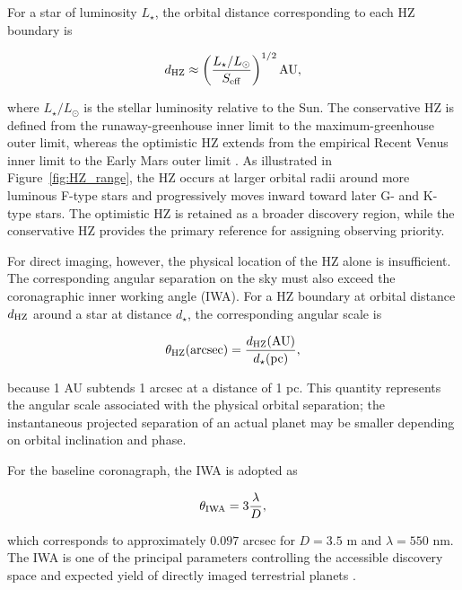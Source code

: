 For a star of luminosity $L_\star$, the orbital distance corresponding to each
HZ boundary is

\begin{equation}
d_{\rm HZ}
\approx
\left(
\frac{L_\star/L_\odot}{S_{\rm eff}}
\right)^{1/2}
{\rm AU},
\label{eq:hz-distance}
\end{equation}

\noindent
where $L_\star/L_\odot$ is the stellar luminosity relative to the Sun. The
conservative HZ is defined from the runaway-greenhouse inner limit to the
maximum-greenhouse outer limit, whereas the optimistic HZ extends from the
empirical Recent Venus inner limit to the Early Mars outer limit
\cite{kopparapu13,kopparapu14}. As illustrated in
Figure~\ref{fig:HZ_range}, the HZ occurs at larger orbital radii around more
luminous F-type stars and progressively moves inward toward later G- and K-type
stars. The optimistic HZ is retained as a broader discovery region, while the
conservative HZ provides the primary reference for assigning observing priority.

For direct imaging, however, the physical location of the HZ alone is insufficient.
The corresponding angular separation on the sky must also exceed the coronagraphic
inner working angle (IWA). For a HZ boundary at orbital distance $d_{\rm HZ}$
around a star at distance $d_\star$, the corresponding angular scale is

\begin{equation}
\theta_{\rm HZ}({\rm arcsec})
=
\frac{d_{\rm HZ}({\rm AU})}{d_\star({\rm pc})},
\label{eq:hz-angular}
\end{equation}

\noindent
because 1 AU subtends 1 arcsec at a distance of 1 pc. This quantity represents
the angular scale associated with the physical orbital separation; the
instantaneous projected separation of an actual planet may be smaller depending
on orbital inclination and phase.

For the baseline coronagraph, the IWA is adopted as

\begin{equation}
\theta_{\rm IWA}
=
3\frac{\lambda}{D},
\label{eq:IWA}
\end{equation}

\noindent
which corresponds to approximately $0.097$ arcsec for $D=3.5$ m and
$\lambda=550$ nm. The IWA is one of the principal parameters controlling the
accessible discovery space and expected yield of directly imaged terrestrial
planets \cite{Stark2014}.


